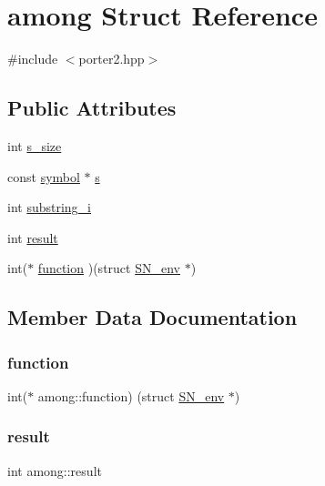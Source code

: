 \hypertarget{structamong}{}\section{among Struct Reference}
\label{structamong}


{\ttfamily \#include $<$porter2.\+hpp$>$}

\subsection*{Public Attributes}
\begin{DoxyCompactItemize}
\item 
int \mbox{\hyperlink{structamong_a6306033b3dac70733b6369d8c857fa17}{s\+\_\+size}}
\item 
const \mbox{\hyperlink{porter2_8hpp_a04438e24473719aaf288c57833717164}{symbol}} $\ast$ \mbox{\hyperlink{structamong_a65bb5a8443fbadd3361d34f539fafd6e}{s}}
\item 
int \mbox{\hyperlink{structamong_a51cda31a957593437c642a1572454131}{substring\+\_\+i}}
\item 
int \mbox{\hyperlink{structamong_a228d4adee95a9a5a9055a547aeb13978}{result}}
\item 
int($\ast$ \mbox{\hyperlink{structamong_a22ec20bb10a12a3ab638901c61ba4b40}{function}} )(struct \mbox{\hyperlink{structSN__env}{S\+N\+\_\+env}} $\ast$)
\end{DoxyCompactItemize}


\subsection{Member Data Documentation}
\mbox{\label{structamong_a22ec20bb10a12a3ab638901c61ba4b40}} 
\subsubsection{\texorpdfstring{function}{function}}
{\footnotesize\ttfamily int($\ast$  among\+::function) (struct \mbox{\hyperlink{structSN__env}{S\+N\+\_\+env}} $\ast$)}

\mbox{\label{structamong_a228d4adee95a9a5a9055a547aeb13978}} 
\subsubsection{\texorpdfstring{result}{result}}
{\footnotesize\ttfamily int among\+::result}

